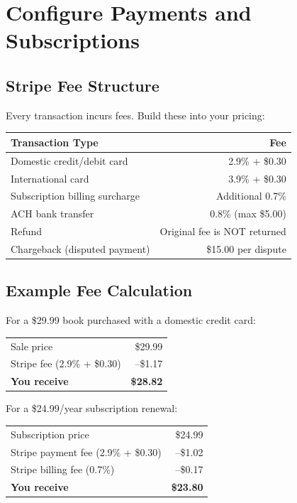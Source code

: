 \documentclass[12pt, letterpaper, oneside]{book}
\begin{document}
\chapter{Configure Payments and Subscriptions}

\section{Stripe Fee Structure}

Every transaction incurs fees. Build these into your pricing:

\begin{table}[H]
\centering
\begin{tabularx}{\textwidth}{Xr}
\toprule
\textbf{Transaction Type} & \textbf{Fee} \\
\midrule
Domestic credit/debit card & 2.9\% + \$0.30 \\
International card & 3.9\% + \$0.30 \\
Subscription billing surcharge & Additional 0.7\% \\
ACH bank transfer & 0.8\% (max \$5.00) \\
Refund & Original fee is NOT returned \\
Chargeback (disputed payment) & \$15.00 per dispute \\
\bottomrule
\end{tabularx}
\end{table}

\section{Example Fee Calculation}

For a \$29.99 book purchased with a domestic credit card:

\begin{table}[H]
\centering
\begin{tabular}{lr}
\toprule
Sale price & \$29.99 \\
Stripe fee (2.9\% + \$0.30) & --\$1.17 \\
\textbf{You receive} & \textbf{\$28.82} \\
\bottomrule
\end{tabular}
\end{table}

For a \$24.99/year subscription renewal:
\begin{table}[H]
\centering
\begin{tabular}{lr}
\toprule
Subscription price & \$24.99 \\
Stripe payment fee (2.9\% + \$0.30) & --\$1.02 \\
Stripe billing fee (0.7\%) & --\$0.17 \\
\textbf{You receive} & \textbf{\$23.80} \\
\bottomrule
\end{tabular}
\end{table}
\end{document}
